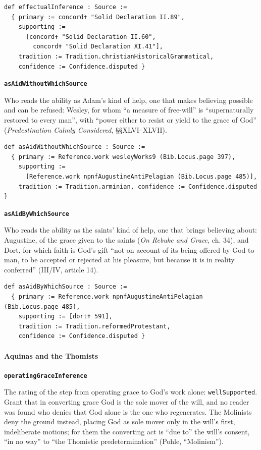 \documentclass[11pt]{article}
\begin{document}
{\small\begin{verbatim}
def effectualInference : Source :=
  { primary := concord✝ "Solid Declaration II.89",
    supporting :=
      [concord✝ "Solid Declaration II.60",
        concord✝ "Solid Declaration XI.41"],
    tradition := Tradition.christianHistoricalGrammatical,
    confidence := Confidence.disputed }
\end{verbatim}}
\par\medskip\noindent\textbf{\texttt{as\allowbreak{}Aid\allowbreak{}Without\allowbreak{}Which\allowbreak{}Source}}\par\nobreak\noindent
Who reads the ability as Adam’s kind of help, one that makes believing possible and can be refused: Wesley, for whom “a measure of free-will” is “supernaturally restored to every man”, with “power either to resist or yield to the grace of God” (\emph{Predestination Calmly Considered}, §§XLVI–XLVII).

{\small\begin{verbatim}
def asAidWithoutWhichSource : Source :=
  { primary := Reference.work wesleyWorks9 (Bib.Locus.page 397),
    supporting :=
      [Reference.work npnfAugustineAntiPelagian (Bib.Locus.page 485)],
    tradition := Tradition.arminian, confidence := Confidence.disputed }
\end{verbatim}}
\par\medskip\noindent\textbf{\texttt{as\allowbreak{}Aid\allowbreak{}By\allowbreak{}Which\allowbreak{}Source}}\par\nobreak\noindent
Who reads the ability as the saints’ kind of help, one that brings believing about: Augustine, of the grace given to the saints (\emph{On Rebuke and Grace}, ch. 34), and Dort, for which faith is God’s gift “not on account of its being offered by God to man, to be accepted or rejected at his pleasure, but because it is in reality conferred” (III/IV, article 14).

{\small\begin{verbatim}
def asAidByWhichSource : Source :=
  { primary := Reference.work npnfAugustineAntiPelagian (Bib.Locus.page 485),
    supporting := [dort✝ 591],
    tradition := Tradition.reformedProtestant,
    confidence := Confidence.disputed }
\end{verbatim}}
\paragraph*{Aquinas and the Thomists}
\leavevmode\par\nobreak
\par\medskip\noindent\textbf{\texttt{operating\allowbreak{}Grace\allowbreak{}Inference}}\par\nobreak\noindent
The rating of the step from operating grace to God’s work alone: \texttt{well\allowbreak{}Supported}. Grant that in converting grace God is the sole mover of the will, and no reader was found who denies that God alone is the one who regenerates. The Molinists deny the ground instead, placing God as sole mover only in the will’s first, indeliberate motions; for them the converting act is “due to” the will’s consent, “in no way” to “the Thomistic predetermination” (Pohle, “Molinism”).
\end{document}

